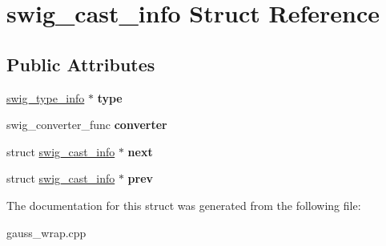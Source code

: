 \hypertarget{structswig__cast__info}{\section{swig\-\_\-cast\-\_\-info Struct Reference}
\label{structswig__cast__info}
}
\subsection*{Public Attributes}
\begin{DoxyCompactItemize}
\item 
\hypertarget{structswig__cast__info_a1c9023a301c8d6806209f4e10df6e9e0}{\hyperlink{structswig__type__info}{swig\-\_\-type\-\_\-info} $\ast$ {\bfseries type}}\label{structswig__cast__info_a1c9023a301c8d6806209f4e10df6e9e0}

\item 
\hypertarget{structswig__cast__info_aa630fddfbb1bf9c97a03f9479ba32f76}{swig\-\_\-converter\-\_\-func {\bfseries converter}}\label{structswig__cast__info_aa630fddfbb1bf9c97a03f9479ba32f76}

\item 
\hypertarget{structswig__cast__info_ae79c6fa058a9d908bbdac14db0c9db5e}{struct \hyperlink{structswig__cast__info}{swig\-\_\-cast\-\_\-info} $\ast$ {\bfseries next}}\label{structswig__cast__info_ae79c6fa058a9d908bbdac14db0c9db5e}

\item 
\hypertarget{structswig__cast__info_afc685bcf38a5a06c6601775138c5999c}{struct \hyperlink{structswig__cast__info}{swig\-\_\-cast\-\_\-info} $\ast$ {\bfseries prev}}\label{structswig__cast__info_afc685bcf38a5a06c6601775138c5999c}

\end{DoxyCompactItemize}


The documentation for this struct was generated from the following file\-:\begin{DoxyCompactItemize}
\item 
gauss\-\_\-wrap.\-cpp\end{DoxyCompactItemize}

